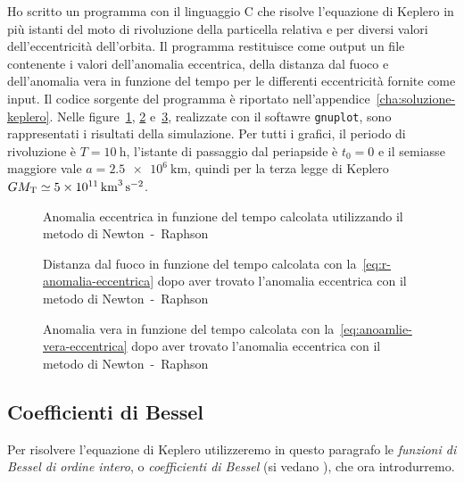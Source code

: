 Ho scritto un programma con il linguaggio C che risolve l'equazione di Keplero
in più istanti del moto di rivoluzione della particella relativa e per diversi
valori dell'eccentricità dell'orbita. Il programma restituisce come output un
file contenente i valori dell'anomalia eccentrica, della distanza dal fuoco e
dell'anomalia vera in funzione del tempo per le differenti eccentricità fornite
come input. Il codice sorgente del programma è riportato
nell'appendice~\ref{cha:soluzione-keplero}. Nelle
figure~\ref{fig:newton-anomalia_eccentrica}, \ref{fig:newton-raggio}
e~\ref{fig:newton-anomalia_vera}, realizzate con il softawre \verb|gnuplot|,
sono rappresentati i risultati della simulazione. Per tutti i grafici, il
periodo di rivoluzione è $T = \SI{10}{\hour}$, l'istante di passaggio dal
periapside è $t_0 = 0$ e il semiasse maggiore vale $a =
\SI{2.5e6}{\kilo\metre}$,
quindi per la terza legge di Keplero
$GM_\textup{T} \simeq \SI{5e11}{\cubic\kilo\metre\per\square\second}$.
\begin{figure}
  \centering
  
  \caption[Anomalia eccentrica in funzione del tempo con il metodo di
  Newton~-~Raphson]{Anomalia eccentrica in funzione del tempo calcolata
    utilizzando il metodo di Newton~-~Raphson}
  \label{fig:newton-anomalia_eccentrica}
\end{figure}
\begin{figure}
  \centering
  
  \caption[Distanza dal fuoco in funzione del tempo con il metodo di
  Newton~-~Raphson]{Distanza dal fuoco in funzione del tempo calcolata con
    la~\eqref{eq:r-anomalia-eccentrica} dopo aver trovato l'anomalia eccentrica
    con il metodo di Newton~-~Raphson}
  \label{fig:newton-raggio}
\end{figure}
\begin{figure}
  \centering
  
  \caption[Anomalia vera in funzione del tempo con il metodo di
  Newton~-~Raphson]{Anomalia vera in funzione del tempo calcolata con
    la~\eqref{eq:anoamlie-vera-eccentrica} dopo aver trovato l'anomalia
    eccentrica con il metodo di Newton~-~Raphson}
  \label{fig:newton-anomalia_vera}
\end{figure}

\subsection{Coefficienti di Bessel}
\label{sec:bessel}

Per risolvere l'equazione di Keplero utilizzeremo in questo paragrafo le
\emph{funzioni di Bessel di ordine intero}, o \emph{coefficienti di
  Bessel} (si vedano \textcites{abramowitz:handbook}{watson:bessel}%
{whittaker:modern-analysis}), che ora introdurremo.

